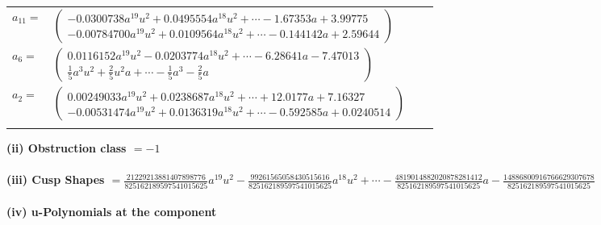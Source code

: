 \documentclass[1p]{elsarticle_modified}
\theoremstyle{definition}
\begin{document}
\begin{tabular}{m{7pt} m{180pt} m{7pt} m{180pt} }
\flushright $a_{11}=$&$\begin{pmatrix}-0.0300738 a^{19} u^{2}+0.0495554 a^{18} u^{2}+\cdots-1.67353 a+3.99775\\-0.00784700 a^{19} u^{2}+0.0109564 a^{18} u^{2}+\cdots-0.144142 a+2.59644\end{pmatrix}$ \\
\flushright $a_{6}=$&$\begin{pmatrix}0.0116152 a^{19} u^{2}-0.0203774 a^{18} u^{2}+\cdots-6.28641 a-7.47013\\\frac{1}{5} a^3 u^2+\frac{2}{5} u^2 a+\cdots-\frac{1}{5} a^3-\frac{2}{5} a\end{pmatrix}$ \\
\flushright $a_{2}=$&$\begin{pmatrix}0.00249033 a^{19} u^{2}+0.0238687 a^{18} u^{2}+\cdots+12.0177 a+7.16327\\-0.00531474 a^{19} u^{2}+0.0136319 a^{18} u^{2}+\cdots-0.592585 a+0.0240514\end{pmatrix}$\\&\end{tabular}
\flushleft \textbf{(ii) Obstruction class $= -1$}\\~\\
\flushleft \textbf{(iii) Cusp Shapes $= \frac{21229213881407898776}{825162189597541015625} a^{19} u^2-\frac{99261565058430515616}{825162189597541015625} a^{18} u^2+\cdots-\frac{4819014882020878281412}{825162189597541015625} a-\frac{14886800916766629307678}{825162189597541015625}$}\\~\\
\newpage\renewcommand{\arraystretch}{1}
\flushleft \textbf{(iv) u-Polynomials at the component}\newline \\
\end{document}
